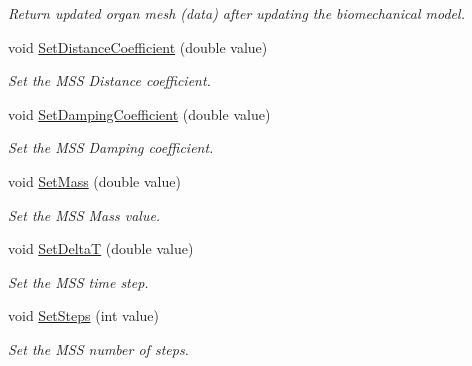 \begin{DoxyCompactItemize}
\begin{DoxyCompactList}\small\item\em Return updated organ mesh (data) after updating the biomechanical model. \item\end{DoxyCompactList}\item 
\hypertarget{classvtkMSSInterface_a9db7eaca5b4cb6f90c1b222c20ffbf0a}{
void \hyperlink{classvtkMSSInterface_a9db7eaca5b4cb6f90c1b222c20ffbf0a}{SetDistanceCoefficient} (double value)}
\label{classvtkMSSInterface_a9db7eaca5b4cb6f90c1b222c20ffbf0a}

\begin{DoxyCompactList}\small\item\em Set the MSS Distance coefficient. \item\end{DoxyCompactList}\item 
\hypertarget{classvtkMSSInterface_a891333114a439fa884475e8493507335}{
void \hyperlink{classvtkMSSInterface_a891333114a439fa884475e8493507335}{SetDampingCoefficient} (double value)}
\label{classvtkMSSInterface_a891333114a439fa884475e8493507335}

\begin{DoxyCompactList}\small\item\em Set the MSS Damping coefficient. \item\end{DoxyCompactList}\item 
\hypertarget{classvtkMSSInterface_af9f984cda3312427de2ecf4131eaa855}{
void \hyperlink{classvtkMSSInterface_af9f984cda3312427de2ecf4131eaa855}{SetMass} (double value)}
\label{classvtkMSSInterface_af9f984cda3312427de2ecf4131eaa855}

\begin{DoxyCompactList}\small\item\em Set the MSS Mass value. \item\end{DoxyCompactList}\item 
\hypertarget{classvtkMSSInterface_a75cec8adf1e5809460ced32d0dc04154}{
void \hyperlink{classvtkMSSInterface_a75cec8adf1e5809460ced32d0dc04154}{SetDeltaT} (double value)}
\label{classvtkMSSInterface_a75cec8adf1e5809460ced32d0dc04154}

\begin{DoxyCompactList}\small\item\em Set the MSS time step. \item\end{DoxyCompactList}\item 
\hypertarget{classvtkMSSInterface_af76881ad53260da7c0f75dff1249599f}{
void \hyperlink{classvtkMSSInterface_af76881ad53260da7c0f75dff1249599f}{SetSteps} (int value)}
\label{classvtkMSSInterface_af76881ad53260da7c0f75dff1249599f}

\begin{DoxyCompactList}\small\item\em Set the MSS number of steps. \item\end{DoxyCompactList}\end{DoxyCompactItemize}
